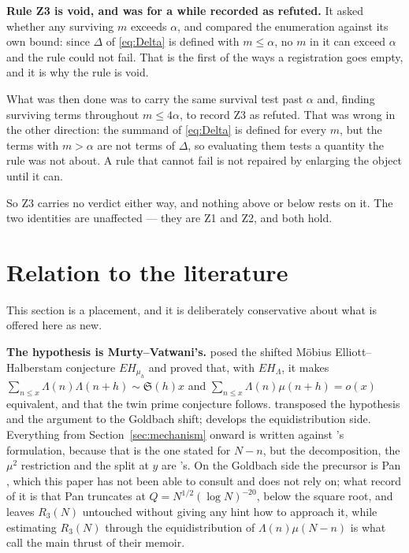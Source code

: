 \documentclass[11pt,a4paper]{article}
\theoremstyle{plain}
\theoremstyle{definition}
\theoremstyle{remark}
\renewcommand{\SS}{\mathfrak{S}}
\begin{document}
\textbf{Rule Z3 is void, and was for a while recorded as refuted.} It
asked whether any surviving $m$ exceeds $\alpha$, and compared the
enumeration against its own bound: since $\Delta$ of \eqref{eq:Delta}
is defined with $m\le\alpha$, no $m$ in it can exceed $\alpha$ and the
rule could not fail. That is the first of the ways a registration goes
empty, and it is why the rule is void.

What was then done was to carry the same survival test past $\alpha$
and, finding surviving terms throughout $m\le4\alpha$, to record Z3 as
refuted. That was wrong in the other direction: the summand of
\eqref{eq:Delta} is defined for every $m$, but the terms with
$m>\alpha$ are not terms of $\Delta$, so evaluating them tests a
quantity the rule was not about. A rule that cannot fail is not repaired
by enlarging the object until it can.

So Z3 carries no verdict either way, and nothing above or below rests
on it. The two identities are unaffected --- they are Z1 and Z2, and
both hold.

\section{Relation to the literature}\label{sec:lit}

This section is a placement, and it is deliberately conservative about
what is offered here as new.

\medskip\noindent
\textbf{The hypothesis is Murty--Vatwani's.} \cite{MV17} posed the
shifted M\"obius Elliott--Halberstam conjecture $EH_{\mu_h}$ and proved
that, with $EH_\Lambda$, it makes
$\sum_{n\le x}\Lambda(n)\Lambda(n+h)\sim\SS(h)x$ and
$\sum_{n\le x}\Lambda(n)\mu(n+h)=o(x)$ equivalent, and that the twin
prime conjecture follows. \cite{HL} transposed the hypothesis and the
argument to the Goldbach shift; \cite{Vat19} develops the
equidistribution side. Everything from
Section~\ref{sec:mechanism} onward is written against \cite{HL}'s
formulation, because that is the one stated for $N-n$, but the
decomposition, the $\mu^2$ restriction and the split at $y$ are
\cite{MV17}'s. On the Goldbach side the precursor is
Pan \cite{Pan}, which this paper has not been able to consult and does
not rely on; what \cite{HL} record of it is that Pan truncates at
$Q=N^{1/2}(\log N)^{-20}$, below the square root, and leaves $R_3(N)$
untouched without giving any hint how to approach it, while estimating
$R_3(N)$ through the equidistribution of $\Lambda(n)\mu(N-n)$ is what
\cite{HL} call the main thrust of their memoir.
\end{document}

